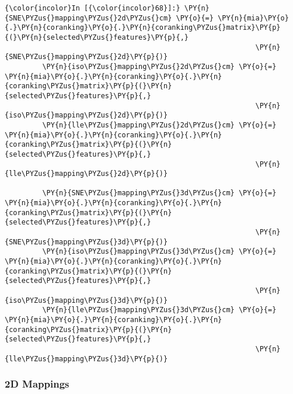     \begin{Verbatim}[commandchars=\\\{\}]
{\color{incolor}In [{\color{incolor}68}]:} \PY{n}{SNE\PYZus{}mapping\PYZus{}2d\PYZus{}cm} \PY{o}{=} \PY{n}{mia}\PY{o}{.}\PY{n}{coranking}\PY{o}{.}\PY{n}{coranking\PYZus{}matrix}\PY{p}{(}\PY{n}{selected\PYZus{}features}\PY{p}{,}
                                                            \PY{n}{SNE\PYZus{}mapping\PYZus{}2d}\PY{p}{)}
         \PY{n}{iso\PYZus{}mapping\PYZus{}2d\PYZus{}cm} \PY{o}{=} \PY{n}{mia}\PY{o}{.}\PY{n}{coranking}\PY{o}{.}\PY{n}{coranking\PYZus{}matrix}\PY{p}{(}\PY{n}{selected\PYZus{}features}\PY{p}{,}
                                                            \PY{n}{iso\PYZus{}mapping\PYZus{}2d}\PY{p}{)}
         \PY{n}{lle\PYZus{}mapping\PYZus{}2d\PYZus{}cm} \PY{o}{=} \PY{n}{mia}\PY{o}{.}\PY{n}{coranking}\PY{o}{.}\PY{n}{coranking\PYZus{}matrix}\PY{p}{(}\PY{n}{selected\PYZus{}features}\PY{p}{,}
                                                            \PY{n}{lle\PYZus{}mapping\PYZus{}2d}\PY{p}{)}

         \PY{n}{SNE\PYZus{}mapping\PYZus{}3d\PYZus{}cm} \PY{o}{=} \PY{n}{mia}\PY{o}{.}\PY{n}{coranking}\PY{o}{.}\PY{n}{coranking\PYZus{}matrix}\PY{p}{(}\PY{n}{selected\PYZus{}features}\PY{p}{,}
                                                            \PY{n}{SNE\PYZus{}mapping\PYZus{}3d}\PY{p}{)}
         \PY{n}{iso\PYZus{}mapping\PYZus{}3d\PYZus{}cm} \PY{o}{=} \PY{n}{mia}\PY{o}{.}\PY{n}{coranking}\PY{o}{.}\PY{n}{coranking\PYZus{}matrix}\PY{p}{(}\PY{n}{selected\PYZus{}features}\PY{p}{,}
                                                            \PY{n}{iso\PYZus{}mapping\PYZus{}3d}\PY{p}{)}
         \PY{n}{lle\PYZus{}mapping\PYZus{}3d\PYZus{}cm} \PY{o}{=} \PY{n}{mia}\PY{o}{.}\PY{n}{coranking}\PY{o}{.}\PY{n}{coranking\PYZus{}matrix}\PY{p}{(}\PY{n}{selected\PYZus{}features}\PY{p}{,}
                                                            \PY{n}{lle\PYZus{}mapping\PYZus{}3d}\PY{p}{)}
\end{Verbatim}

    \subsubsection{2D Mappings}\label{d-mappings}

